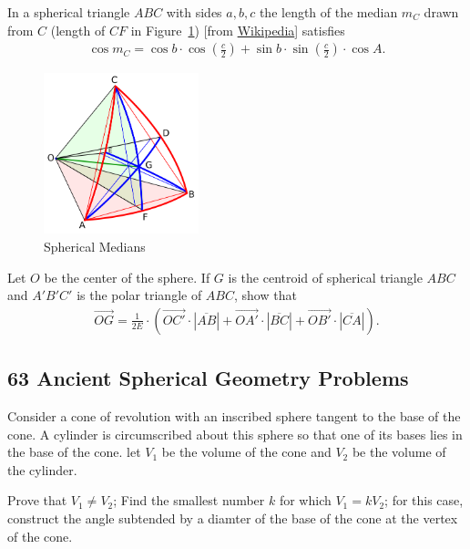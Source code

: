 \begin{tcolorbox}[title={Medians of Spherical Triangles}]
    \begin{question}
        In a spherical triangle $ABC$ with sides $a,b,c$ the length of the median $m_C$ drawn from $C$ (length of $CF$ in Figure~\ref{fig:medians}) [from \href{https://commons.wikimedia.org/wiki/File:Spherical_medians.svg}{Wikipedia}] satisfies
        \begin{align*}
            \cos m_{C}=\cos b\cdot \cos\left( {\frac {c}{2}}\right)+\sin b\cdot \sin\left({\frac {c}{2}}\right)\cdot \cos A. 
        \end{align*}
        \begin{figure}[H]
        \centering
        \includegraphics[width=0.4\textwidth]{IMG/Medians.png}
        \caption{Spherical Medians }
        \label{fig:medians}
    \end{figure}
    \begin{question}
        Let $O$ be the center of the sphere. If $G$ is the centroid of spherical triangle $ABC$ and $A'B'C'$ is the polar triangle of $ABC$, show that
        \begin{align*}
            {\overrightarrow {OG}}={\frac {1}{2E}}\cdot \left({\overrightarrow {OC'}}\cdot |{\overline {AB}}|+{\overrightarrow { OA'}}\cdot |{\overline {BC}}|+{\overrightarrow {OB'}}\cdot |{\overline {CA}}|\right).
        \end{align*}
    \end{question}
    \end{question}
\end{tcolorbox}



\subsection{63 Ancient Spherical Geometry Problems}

\begin{question}[name={1960 International Mathematical Olympiad}]
	Consider a cone of revolution with an inscribed sphere tangent to the base of the cone. A cylinder is circumscribed about this sphere so that one of its bases lies in the base of the cone. let $V_1$ be the volume of the cone and $V_2$ be the volume of the cylinder.
	\begin{tasks}
		\task Prove that $V_1 \neq V_2$;
		\task  Find the smallest number $k$ for which $V_1=kV_2$; for this case, construct the angle subtended by a diamter of the base of the cone at the vertex of the cone.
	\end{tasks}
\end{question}

